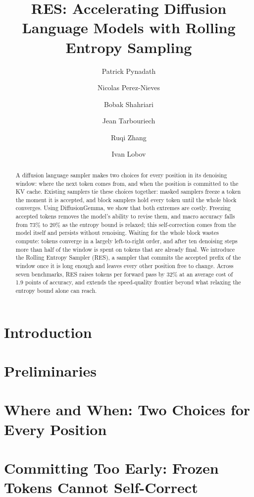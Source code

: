 \documentclass[11pt, a4paper, logo, copyright, gdm]{google}
\title{RES: Accelerating Diffusion Language Models with Rolling Entropy Sampling}
\author[1,*]{Patrick Pynadath}
\author[2]{Nicolas Perez-Nieves}
\author[2]{Bobak Shahriari}
\author[2]{Jean Tarbouriech}
\author[1]{Ruqi Zhang}
\author[*]{Ivan Lobov}
\affil[1]{Purdue University}
\affil[2]{Google DeepMind}
\affil[*]{Work done while at Google DeepMind.}
\begin{document}
\newcommand{\algname}{RES}
\newcommand{\algabbrev}{RES}

\begin{abstract}
A diffusion language sampler makes two choices for every position in its denoising window: where the next token comes from, and when the position is committed to the KV cache.
Existing samplers tie these choices together: masked samplers freeze a token the moment it is accepted, and block samplers hold every token until the whole block converges.
Using DiffusionGemma, we show that both extremes are costly.
Freezing accepted tokens removes the model's ability to revise them, and macro accuracy falls from 73\% to 20\% as the entropy bound is relaxed; this self-correction comes from the model itself and persists without renoising.
Waiting for the whole block wastes compute: tokens converge in a largely left-to-right order, and after ten denoising steps more than half of the window is spent on tokens that are already final.
We introduce the Rolling Entropy Sampler (RES), a sampler that commits the accepted prefix of the window once it is long enough and leaves every other position free to change.
Across seven benchmarks, RES raises tokens per forward pass by 32\% at an average cost of 1.9 points of accuracy, and extends the speed-quality frontier beyond what relaxing the entropy bound alone can reach.
\end{abstract}

\maketitle

\section{Introduction}
\label{sec:intro}


\section{Preliminaries}
\label{sec:prelims}


\section{Where and When: Two Choices for Every Position}
\label{sec:motivation}


\section{Committing Too Early: Frozen Tokens Cannot Self-Correct}
\label{sec:too-early}

\end{document}
